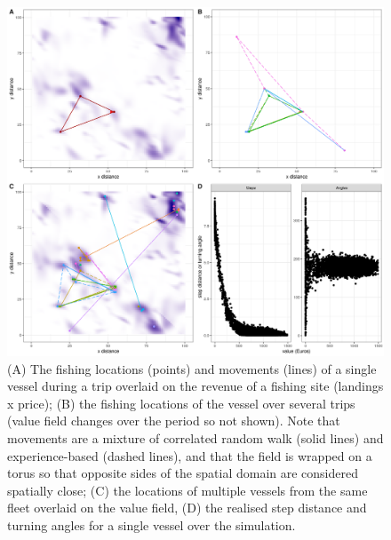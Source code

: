 \documentclass[review]{elsarticle}
\begin{document}
\begin{figure}[!ht]
	\includegraphics[width = \linewidth]{Plots/Combined_Movement}
	\caption{(A) The fishing locations (points) and movements (lines) of a
		single vessel during a trip overlaid on the revenue of a
		fishing site (landings x price); (B) the fishing locations of
		the vessel over several trips (value field changes over the
		period so not shown). Note that movements are a mixture of
		correlated random walk (solid lines) and experience-based
		(dashed lines), and that the field is wrapped on a torus so
		that opposite sides of the spatial domain are considered
		spatially close; (C) the locations of multiple vessels from the
		same fleet overlaid on the value field, (D) the realised step
		distance and turning angles for a single vessel over the
		simulation.}
	\label{fig:mv}
\end{figure}	
\end{document}
